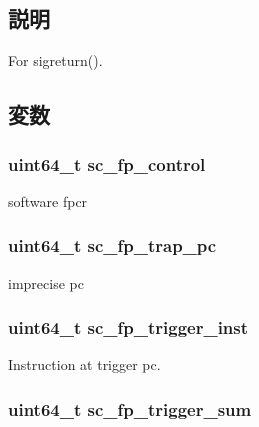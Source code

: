 \subsection{説明}
For sigreturn(). 

\subsection{変数}
\hypertarget{structTru64_1_1sigcontext_a7424e3c8190d07388ff2556b9bbdead7}{
\subsubsection[{sc\_\-fp\_\-control}]{\setlength{\rightskip}{0pt plus 5cm}uint64\_\-t {\bf sc\_\-fp\_\-control}}}
\label{structTru64_1_1sigcontext_a7424e3c8190d07388ff2556b9bbdead7}


software fpcr \hypertarget{structTru64_1_1sigcontext_ab10a3d10e3fe65f63611c9a40a8d2f38}{
\subsubsection[{sc\_\-fp\_\-trap\_\-pc}]{\setlength{\rightskip}{0pt plus 5cm}uint64\_\-t {\bf sc\_\-fp\_\-trap\_\-pc}}}
\label{structTru64_1_1sigcontext_ab10a3d10e3fe65f63611c9a40a8d2f38}


imprecise pc \hypertarget{structTru64_1_1sigcontext_a64e94a086e3a5973c5eb9bf5412fe9cb}{
\subsubsection[{sc\_\-fp\_\-trigger\_\-inst}]{\setlength{\rightskip}{0pt plus 5cm}uint64\_\-t {\bf sc\_\-fp\_\-trigger\_\-inst}}}
\label{structTru64_1_1sigcontext_a64e94a086e3a5973c5eb9bf5412fe9cb}


Instruction at trigger pc. \hypertarget{structTru64_1_1sigcontext_ac63ae298a0894715703d0df20f66043b}{
\subsubsection[{sc\_\-fp\_\-trigger\_\-sum}]{\setlength{\rightskip}{0pt plus 5cm}uint64\_\-t {\bf sc\_\-fp\_\-trigger\_\-sum}}}
\label{structTru64_1_1sigcontext_ac63ae298a0894715703d0df20f66043b}


